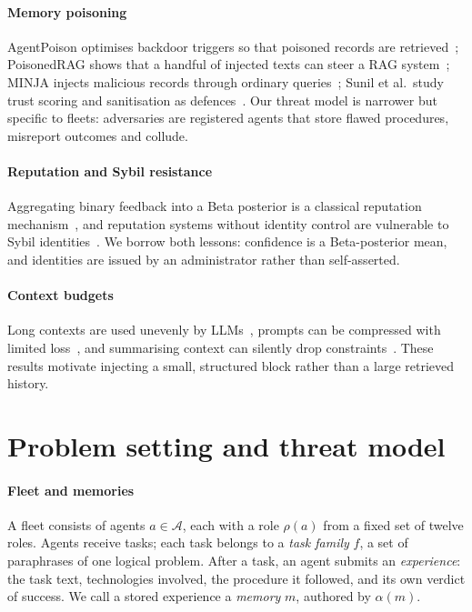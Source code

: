 \documentclass[5p,times,twocolumn]{elsarticle}
\begin{document}
\paragraph{Memory poisoning}
AgentPoison optimises backdoor triggers so that poisoned records are retrieved~\cite{chen2024agentpoison}; PoisonedRAG shows that a handful of injected texts can steer a RAG system~\cite{zou2025poisonedrag}; MINJA injects malicious records through ordinary queries~\cite{dong2025minja}; Sunil et al.\ study trust scoring and sanitisation as defences~\cite{sunil2026poisoning}. Our threat model is narrower but specific to fleets: adversaries are registered agents that store flawed procedures, misreport outcomes and collude.

\paragraph{Reputation and Sybil resistance}
Aggregating binary feedback into a Beta posterior is a classical reputation mechanism~\cite{josang2002beta}, and reputation systems without identity control are vulnerable to Sybil identities~\cite{douceur2002sybil}. We borrow both lessons: confidence is a Beta-posterior mean, and identities are issued by an administrator rather than self-asserted.

\paragraph{Context budgets}
Long contexts are used unevenly by LLMs~\cite{liu2024lost}, prompts can be compressed with limited loss~\cite{jiang2023llmlingua}, and summarising context can silently drop constraints~\cite{chen2026decay}. These results motivate injecting a small, structured block rather than a large retrieved history.

\section{Problem setting and threat model}
\label{sec:problem}

\paragraph{Fleet and memories}
A fleet consists of agents $a \in \mathcal{A}$, each with a role $\rho(a)$ from a fixed set of twelve roles. Agents receive tasks; each task belongs to a \emph{task family} $f$, a set of paraphrases of one logical problem. After a task, an agent submits an \emph{experience}: the task text, technologies involved, the procedure it followed, and its own verdict of success. We call a stored experience a \emph{memory} $m$, authored by $\alpha(m)$.
\end{document}
